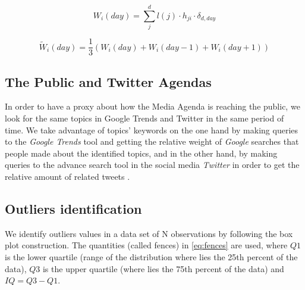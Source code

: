 \documentclass[a4paper, 12pt]{article}
\begin{document}
\begin{equation}
W_i(day) = \sum_j^d l(j) \cdot h_{ji} \cdot \delta_{d,day}
\label{eq:topic_weight}
\end{equation}

\begin{equation}
\tilde{W}_i(day) = \frac{1}{3} ({W}_i(day) + {W}_i(day - 1) + W_i(day + 1))
\label{eq:topic_weight_norm}
\end{equation}

\subsection{The Public and Twitter Agendas}
 
\par In order to have a proxy about how the Media Agenda is reaching the public, we look for the same topics in Google Trends and Twitter in the same period of time. We take advantage of topics' keywords on the one hand by making queries to the \emph{Google Trends} tool and getting the relative weight of \emph{Google} searches that people made about the identified topics, and in the other hand, by making queries to the advance search tool in the social media \emph{Twitter} in order to get the relative amount of related tweets . 




\subsection{Outliers identification}
\label{sec:outliers_identification}

\par We identify outliers values in a data set of N observations by following the box plot construction. The quantities (called fences) in \ref{eq:fences} are used, where $Q1$ is the lower quartile (range of the distribution where lies the 25th percent of the data), $Q3$ is the upper quartile (where lies the 75th percent of the data) and $IQ = Q3 - Q1$.
\end{document}
